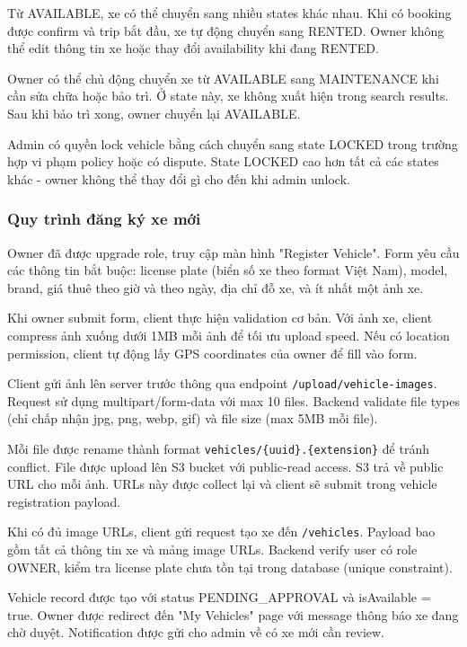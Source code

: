 Từ AVAILABLE, xe có thể chuyển sang nhiều states khác nhau. Khi có booking được confirm và trip bắt đầu, xe tự động chuyển sang RENTED. Owner không thể edit thông tin xe hoặc thay đổi availability khi đang RENTED.

Owner có thể chủ động chuyển xe từ AVAILABLE sang MAINTENANCE khi cần sửa chữa hoặc bảo trì. Ở state này, xe không xuất hiện trong search results. Sau khi bảo trì xong, owner chuyển lại AVAILABLE.

Admin có quyền lock vehicle bằng cách chuyển sang state LOCKED trong trường hợp vi phạm policy hoặc có dispute. State LOCKED cao hơn tất cả các states khác - owner không thể thay đổi gì cho đến khi admin unlock.

\subsubsection{Quy trình đăng ký xe mới}
Owner đã được upgrade role, truy cập màn hình "Register Vehicle". Form yêu cầu các thông tin bắt buộc: license plate (biển số xe theo format Việt Nam), model, brand, giá thuê theo giờ và theo ngày, địa chỉ đỗ xe, và ít nhất một ảnh xe.

Khi owner submit form, client thực hiện validation cơ bản. Với ảnh xe, client compress ảnh xuống dưới 1MB mỗi ảnh để tối ưu upload speed. Nếu có location permission, client tự động lấy GPS coordinates của owner để fill vào form.

Client gửi ảnh lên server trước thông qua endpoint \texttt{/upload/vehicle-images}. Request sử dụng multipart/form-data với max 10 files. Backend validate file types (chỉ chấp nhận jpg, png, webp, gif) và file size (max 5MB mỗi file).

Mỗi file được rename thành format \texttt{vehicles/\{uuid\}.\{extension\}} để tránh conflict. File được upload lên S3 bucket với public-read access. S3 trả về public URL cho mỗi ảnh. URLs này được collect lại và client sẽ submit trong vehicle registration payload.

Khi có đủ image URLs, client gửi request tạo xe đến \texttt{/vehicles}. Payload bao gồm tất cả thông tin xe và mảng image URLs. Backend verify user có role OWNER, kiểm tra license plate chưa tồn tại trong database (unique constraint).

Vehicle record được tạo với status PENDING\_APPROVAL và isAvailable = true. Owner được redirect đến "My Vehicles" page với message thông báo xe đang chờ duyệt. Notification được gửi cho admin về có xe mới cần review.


